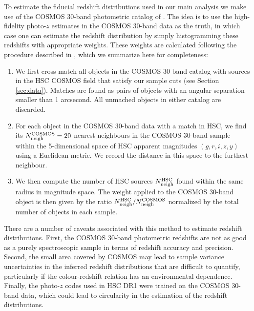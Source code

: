 \documentclass[a4paper,11pt]{article}
\begin{document}
    To estimate the fiducial redshift distributions used in our main analysis we make use of the COSMOS 30-band photometric catalog of \cite{2016ApJS..224...24L}. The idea is to use the high-fidelity photo-$z$ estimates in the COSMOS 30-band data as the truth, in which case one can estimate the redshift distribution by simply histogramming these redshifts with appropriate weights. These weights are calculated following the procedure described in \cite{2017MNRAS.465.1454H,2019PASJ...71...43H}, which we summarize here for completeness:
    \begin{enumerate}
      \item We first cross-match all objects in the COSMOS 30-band catalog with sources in the HSC COSMOS field that satisfy our sample cuts (see Section \ref{sec:data}). Matches are found as pairs of objects with an angular separation smaller than 1 arcsecond. All unmached objects in either catalog are discarded.
      \item For each object in the COSMOS 30-band data with a match in HSC, we find its $N_{\rm neigh}^{\rm COSMOS}=20$ nearest neighbours in the COSMOS 30-band sample within the 5-dimensional space of HSC apparent magnitudes $(g,r,i,z,y)$ using a Euclidean metric. We record the distance in this space to the furthest neighbour.
      \item We then compute the number of HSC sources $N_{\rm neigh}^{\rm HSC}$ found within the same radius in magnitude space. The weight applied to the COSMOS 30-band object is then given by the ratio $N^{\rm HSC}_{\rm neigh}/N^{\rm COSMOS}_{\rm neigh}$ normalized by the total number of objects in each sample.
    \end{enumerate}
    There are a number of caveats associated with this method to estimate redshift distributions. First, the COSMOS 30-band photometric redshifts are not as good as a purely spectroscopic sample in terms of redshift accuracy and precision. Second, the small area covered by COSMOS may lead to sample variance uncertainties in the inferred redshift distributions that are difficult to quantify, particularly if the colour-redshift relation has an environmental dependence. Finally, the photo-$z$ codes used in HSC DR1 were trained on the COSMOS 30-band data, which could lead to circularity in the estimation of the redshift distributions.
    
\end{document}
